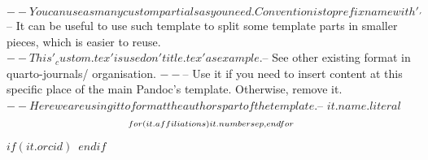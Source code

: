 $-- You can use as many custom partials as you need. Convention is to prefix name with '_'
$-- It can be useful to use such template to split some template parts in smaller pieces, which is easier to reuse. 
$-- This '_custom.tex' is used on 'title.tex' as example.
$-- See other existing format in quarto-journals/ organisation.
$-- %
$-- Use it if you need to insert content at this specific place of the main Pandoc's template. Otherwise, remove it.
$-- Here we are using it to format the authors part of the template.
$-- %
$it.name.literal$$$\textsuperscript{$for(it.affiliations)$$it.number$$sep$,$endfor$}$$$if(it.orcid)$~$endif$